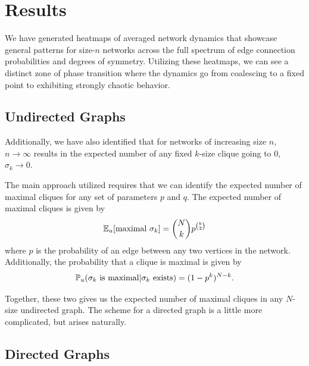 
\section{Results}
\label{sec:Results}

We have generated heatmaps of averaged network dynamics that showcase general patterns for size-$n$ networks across the full spectrum of edge connection probabilities and degrees of symmetry. Utilizing these heatmaps, we can see a distinct zone of phase transition where the dynamics go from coalescing to a fixed point to exhibiting strongly chaotic behavior.


\subsection{Undirected Graphs}%
\label{sub:Undirected Graphs}

Additionally, we have also identified that for networks of increasing size $n$, $n\to\infty$ results in the expected number of any fixed $k$-size clique going to 0, $\sigma_k \to 0$.

The main approach utilized requires that we can identify the expected number of maximal cliques for any set of parameters $p$ and $q$. The expected number of maximal cliques is given by
\begin{align}
    \label{eq:e of max}
    \mathbb{E}_u[\mbox{maximal } \sigma_k] = \binom{N}{k}p^{\binom{k}{2}}
\end{align}
where $p$ is the probability of an edge between any two vertices in the network.
Additionally, the probability that a clique is maximal is given by
\begin{align}
    \label{eq:p max undirected}
    \mathbb{P}_u{(\sigma_k \mbox{ is maximal}|\sigma_k \mbox{ exists})} = (1-p^k)^{N-k}.
\end{align}

Together, these two gives us the expected number of maximal cliques in any $N$-size undirected graph. The scheme for a directed graph is a little more complicated, but arises naturally.

\subsection{Directed Graphs}%
\label{sub:Directed Graphs}

